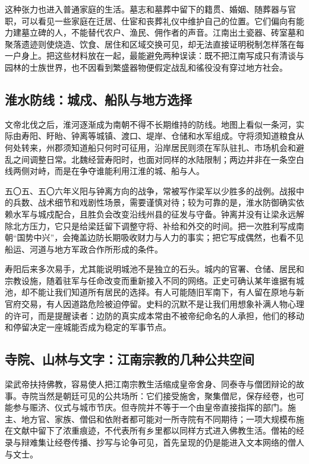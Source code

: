 这种张力也进入普通家庭的生活。墓志和墓葬中留下的籍贯、婚姻、随葬器与官职，可以看见一些家庭在迁居、仕宦和丧葬礼仪中维护自己的位置。它们偏向有能力建墓立碑的人，不能替代农户、渔民、佣作者的声音。江南出土瓷器、砖室墓和聚落遗迹则使烧造、饮食、居住和区域交换可见，却无法直接证明税制怎样落在每一户身上。把这些材料放在一起，最能避免两种误读：既不把江南写成只有清谈与园林的士族世界，也不因看到繁盛器物便假定战乱和徭役没有穿过地方社会。

\subsection{淮水防线：城戍、船队与地方选择}

文帝北伐之后，淮河逐渐成为南朝不得不长期维持的防线。地图上看似一条河，实际由寿阳、盱眙、钟离等城镇、渡口、堤岸、仓储和水军组成。守将须知道粮食从何处转来，州郡须知道船只何时可征用，沿岸居民则须在军队驻扎、市场机会和避乱之间调整日常。北魏经营寿阳时，也面对同样的水陆限制；两边并非在一条空白线两侧对峙，而是在争夺谁能利用江淮的城、船与人。

五〇五、五〇六年义阳与钟离方向的战争，常被写作梁军以少胜多的战例。战报中的兵数、战术细节和戏剧性场景，需要谨慎对待；较为可靠的是，淮水防御确实依赖水军与城戍配合，且胜负会改变沿线州县的征发与守备。钟离并没有让梁永远解除北方压力，它只是给梁廷留下调整守将、补给和外交的时间。把一次胜利写成南朝“国势中兴”，会掩盖边防长期吸收财力与人力的事实；把它写成偶然，也看不见船运、河道与地方军政合作所形成的条件。

寿阳后来多次易手，尤其能说明城池不是独立的石头。城内的官署、仓储、居民和宗教设施，随着驻军与任命改变而重新接入不同的网络。正史可确认某年谁据有城池，却不能让我们知道所有居民的选择。有人可能随旧军南下，有人留在原地与新官府交易，有人因道路危险被迫停留。史料的沉默不是让我们用想象补满人物心理的许可，而是提醒读者：边防的真实成本常由不被帝纪命名的人承担，他们的移动和停留决定一座城能否成为稳定的军事节点。

\subsection{寺院、山林与文字：江南宗教的几种公共空间}

梁武帝扶持佛教，容易使人把江南宗教生活缩成皇帝舍身、同泰寺与僧团辩论的故事。寺院当然是朝廷可见的公共场所：它们接受施舍，聚集僧尼，保存经卷，也可能参与赈济、仪式与城市节庆。但寺院并不等于一个由皇帝直接指挥的部门。施主、地方官、家族、僧侣和依附者都可能对一所寺院有不同期待；一项大规模布施在文献中留下了浓重痕迹，不代表所有乡里都以同样方式进入佛教生活。僧祐的经录与辩难集让经卷传播、抄写与论争可见，首先呈现的仍是能进入文本网络的僧人与文士。

